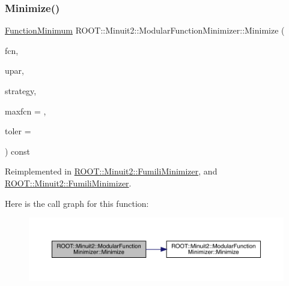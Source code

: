 \subsubsection{\texorpdfstring{Minimize()}{Minimize()}\hspace{0.1cm}{\footnotesize\ttfamily [10/22]}}
{\footnotesize\ttfamily \mbox{\hyperlink{classROOT_1_1Minuit2_1_1FunctionMinimum}{Function\+Minimum}} R\+O\+O\+T\+::\+Minuit2\+::\+Modular\+Function\+Minimizer\+::\+Minimize (\begin{DoxyParamCaption}\item[{const \mbox{\hyperlink{classROOT_1_1Minuit2_1_1FCNBase}{F\+C\+N\+Base}} \&}]{fcn,  }\item[{const \mbox{\hyperlink{classROOT_1_1Minuit2_1_1MnUserParameters}{Mn\+User\+Parameters}} \&}]{upar,  }\item[{const \mbox{\hyperlink{classROOT_1_1Minuit2_1_1MnStrategy}{Mn\+Strategy}} \&}]{strategy,  }\item[{unsigned int}]{maxfcn = {},  }\item[{double}]{toler = {} }\end{DoxyParamCaption}) const\hspace{0.3cm}{\ttfamily [virtual]}}



Reimplemented in \mbox{\hyperlink{classROOT_1_1Minuit2_1_1FumiliMinimizer_a22c4059fb94d5e40c843ac90440d2975}{R\+O\+O\+T\+::\+Minuit2\+::\+Fumili\+Minimizer}}, and \mbox{\hyperlink{classROOT_1_1Minuit2_1_1FumiliMinimizer_a22c4059fb94d5e40c843ac90440d2975}{R\+O\+O\+T\+::\+Minuit2\+::\+Fumili\+Minimizer}}.

Here is the call graph for this function\+:\nopagebreak
\begin{figure}[H]
\begin{center}
\leavevmode
\includegraphics[width=350pt]{d3/dc8/classROOT_1_1Minuit2_1_1ModularFunctionMinimizer_a93dcf0b210bf0f3ffba5b7b1099751e6_cgraph}
\end{center}
\end{figure}
\mbox{\label{classROOT_1_1Minuit2_1_1ModularFunctionMinimizer_a71fd7fab341881d9d082d4d2d5f5ed2d}} 
